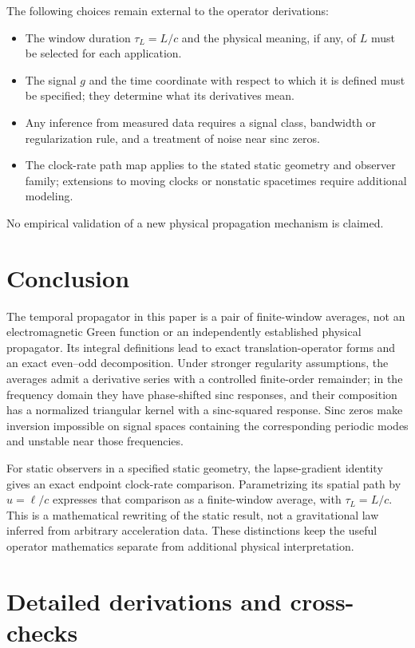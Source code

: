 \documentclass[12pt]{article}
\begin{document}
The following choices remain external to the operator derivations:
\begin{itemize}
  \item The window duration $\tau_L=L/c$ and the physical meaning, if any, of $L$ must be selected for each application.
  \item The signal $g$ and the time coordinate with respect to which it is defined must be specified; they determine what its derivatives mean.
  \item Any inference from measured data requires a signal class, bandwidth or regularization rule, and a treatment of noise near sinc zeros.
  \item The clock-rate path map applies to the stated static geometry and observer family; extensions to moving clocks or nonstatic spacetimes require additional modeling.
\end{itemize}
No empirical validation of a new physical propagation mechanism is claimed.

\section{Conclusion}

The temporal propagator in this paper is a pair of finite-window averages, not an electromagnetic Green function or an independently established physical propagator. Its integral definitions lead to exact translation-operator forms and an exact even--odd decomposition. Under stronger regularity assumptions, the averages admit a derivative series with a controlled finite-order remainder; in the frequency domain they have phase-shifted sinc responses, and their composition has a normalized triangular kernel with a sinc-squared response. Sinc zeros make inversion impossible on signal spaces containing the corresponding periodic modes and unstable near those frequencies.

For static observers in a specified static geometry, the lapse-gradient identity gives an exact endpoint clock-rate comparison. Parametrizing its spatial path by $u=\ell/c$ expresses that comparison as a finite-window average, with $\tau_L=L/c$. This is a mathematical rewriting of the static result, not a gravitational law inferred from arbitrary acceleration data. These distinctions keep the useful operator mathematics separate from additional physical interpretation.

\appendix

\section{Detailed derivations and cross-checks}
\end{document}
